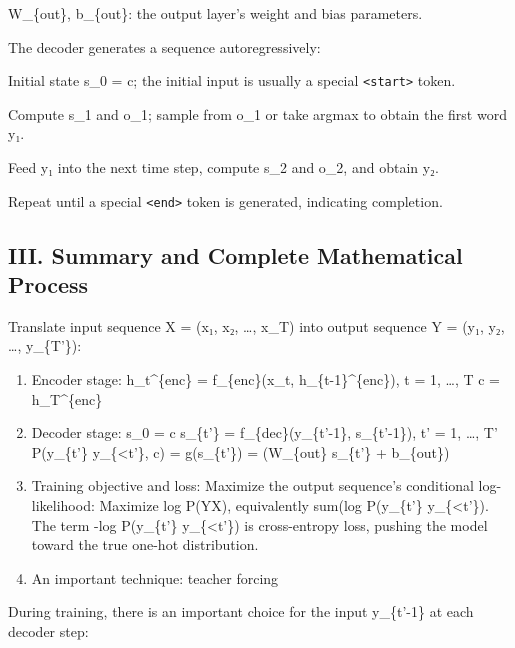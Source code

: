 W\_\{out\}, b\_\{out\}: the output layer's weight and bias parameters.

The decoder generates a sequence autoregressively:

Initial state s\_0 = c; the initial input is usually a special \texttt{\textless{}start\textgreater{}} token.

Compute s\_1 and o\_1; sample from o\_1 or take argmax to obtain the first word y₁.

Feed y₁ into the next time step, compute s\_2 and o\_2, and obtain y₂.

Repeat until a special \texttt{\textless{}end\textgreater{}} token is generated, indicating completion.

\hypertarget{iii.-summary-and-complete-mathematical-process}{%
\subsection{III. Summary and Complete Mathematical Process}\label{iii.-summary-and-complete-mathematical-process}}

Translate input sequence X = (x₁, x₂, \ldots, x\_T) into output sequence Y = (y₁, y₂, \ldots, y\_\{T'\}):

\begin{enumerate}
\def\labelenumi{\arabic{enumi}.}
\item
{}
  Encoder stage:
  h\_t\^{}\{enc\} = f\_\{enc\}(x\_t, h\_\{t-1\}\^{}\{enc\}), \quad {} t = 1, \ldots, T
  c = h\_T\^{}\{enc\}
\item
{}
  Decoder stage:
  s\_0 = c
  s\_\{t'\} = f\_\{dec\}(y\_\{t'-1\}, s\_\{t'-1\}), \quad {} t' = 1, \ldots, T'
  P(y\_\{t'\} \textbar{} y\_\{\textless t'\}, c) = g(s\_\{t'\}) = (W\_\{out\} s\_\{t'\} + b\_\{out\})
\item
{}
  Training objective and loss:
  Maximize the output sequence's conditional log-likelihood:
  Maximize log P(Y\textbar X), equivalently sum(log P(y\_\{t'\} \textbar{} y\_\{\textless t'\}). The term -log P(y\_\{t'\} \textbar{} y\_\{\textless t'\}) is cross-entropy loss, pushing the model toward the true one-hot distribution.
\item
  An important technique: teacher forcing
\end{enumerate}

During training, there is an important choice for the input y\_\{t'-1\} at each decoder step:

